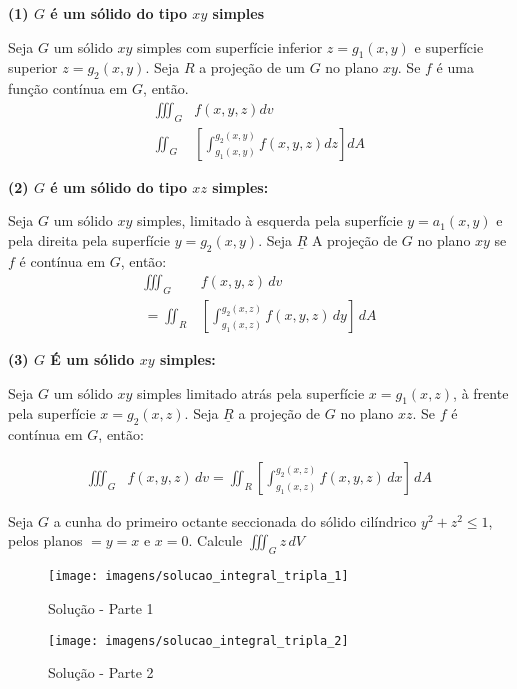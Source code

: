 \documentclass[portugues, 11pt]{article}
\begin{document}
	\textbf{(1) $G$ é um sólido do tipo $xy$ simples}
	\begin{thrm}
		Seja $G$ um sólido $xy$ simples com superfície inferior $z=g_1(x,y)$ e superfície superior $z=g_2(x,y)$. Seja $R$ a projeção de um $G$ no plano $xy$. Se $f$ é uma função contínua em $G$, então.
		\begin{align*}
		\iiint_G & {f(x,y,z)}{dv}
		\\
		\iint_G  & [\int_{g_1 (x,y)}^{g_2 (x,y)} {f(x,y,z)}{dz} ] {dA}
		\end{align*}
	\end{thrm}
	
	\textbf{(2) $G$ é um sólido do tipo $xz$ simples: }
	\begin{thrm}
		Seja $G$ um sólido $xy$ simples, limitado à esquerda pela superfície $y=a_1 (x,y)$ e pela direita pela superfície $y=g_2 (x,y)$. Seja $\underline{R}$ A projeção de $G$ no plano $xy$ se $f$ é contínua em $G$, então: 
		\begin{align*}
			\iiint_G & {f(x,y,z)} \,dv \\
			= \iint_R & \left[ \int_{g_1(x,z)}^{g_2(x,z)}	f(x,y,z) \,dy \right ] \,dA 
		\end{align*}
	\end{thrm}


	\textbf{(3) $G$ É um sólido $xy$ simples:}
	\begin{thrm}
		Seja $G$ um sólido $xy$ simples limitado atrás pela superfície $x=g_1(x,z)$, à frente pela superfície $x=g_2(x,z)$.
		Seja $\underline{R}$ a projeção de $G$ no plano $xz$. Se $f$ é contínua em $G$, então:
		
		\begin{align*}
			\iiint_G & f(x,y,z) \,dv
			= \iint_R \left [ \int_{g_1(x,z)}^{g_2(x,z)} f(x,y,z) \,dx \right ] \,dA
		\end{align*}
	\end{thrm}
	
	\begin{exmp}
		Seja $G$ a cunha do primeiro octante seccionada do sólido cilíndrico $y^2+z^2 \leq 1$, pelos planos $=y=x$ e $x=0$.
		Calcule $\iiint_G z \,dV$ \\
		\begin{figure}[h]
			\centering
			\texttt{[image: imagens/solucao\_integral\_tripla\_1]}
			\caption{Solução - Parte 1}
			\label{fig:int_tripla_1}			
		\end{figure}
		\begin{figure}[h]
			\centering
			\texttt{[image: imagens/solucao\_integral\_tripla\_2]}
			\caption{Solução - Parte 2}
			\label{fig:int_tripla_2}			
		\end{figure}
	\end{exmp}

		
	



	
	
	

	
  
\end{document}
